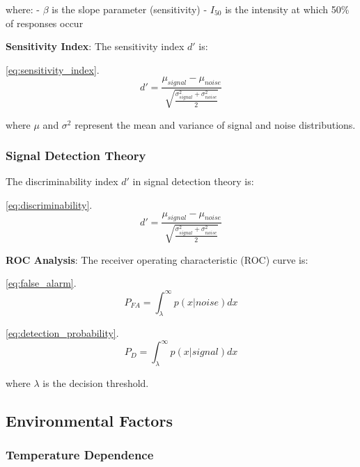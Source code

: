 \documentclass[
  13pt,
  a4paperpaper,
  12pt]{article}
\begin{document}
where: - \(\beta\) is the slope parameter (sensitivity) - \(I_{50}\) is
the intensity at which 50\% of responses occur

\textbf{Sensitivity Index}: The sensitivity index \(d'\) is:

\eqref{eq:sensitivity_index}. \begin{equation}
d' = \frac{\mu_{signal} - \mu_{noise}}{\sqrt{\frac{\sigma_{signal}^2 + \sigma_{noise}^2}{2}}} \label{eq:sensitivity_index}
\end{equation}

where \(\mu\) and \(\sigma^2\) represent the mean and variance of signal
and noise distributions.

\subsubsection{Signal Detection Theory}\label{signal-detection-theory}

The discriminability index \(d'\) in signal detection theory is:

\eqref{eq:discriminability}. \begin{equation}
d' = \frac{\mu_{signal} - \mu_{noise}}{\sqrt{\frac{\sigma_{signal}^2 + \sigma_{noise}^2}{2}}} \label{eq:discriminability}
\end{equation}

\textbf{ROC Analysis}: The receiver operating characteristic (ROC) curve
is:

\eqref{eq:false_alarm}. \begin{equation}
P_{FA} = \int_{\lambda}^{\infty} p(x|noise) dx \label{eq:false_alarm}
\end{equation}

\eqref{eq:detection_probability}. \begin{equation}
P_D = \int_{\lambda}^{\infty} p(x|signal) dx \label{eq:detection_probability}
\end{equation}

where \(\lambda\) is the decision threshold.

\subsection{Environmental Factors}\label{environmental-factors}

\subsubsection{Temperature Dependence}\label{temperature-dependence}
\end{document}
